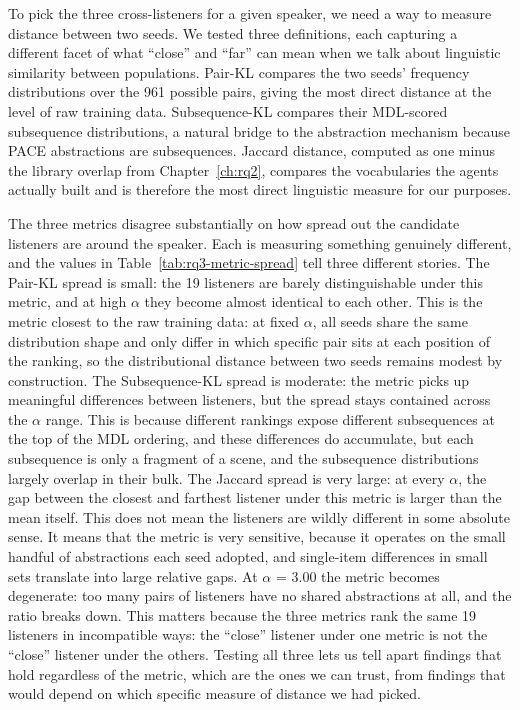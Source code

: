 To pick the three cross-listeners for a given speaker, we need a way to measure distance between two seeds. We tested three definitions, each capturing a different facet of what ``close'' and ``far'' can mean when we talk about linguistic similarity between populations. Pair-KL compares the two seeds' frequency distributions over the 961 possible pairs, giving the most direct distance at the level of raw training data. Subsequence-KL compares their MDL-scored subsequence distributions, a natural bridge to the abstraction mechanism because PACE abstractions are subsequences. Jaccard distance, computed as one minus the library overlap from Chapter~\ref{ch:rq2}, compares the vocabularies the agents actually built and is therefore the most direct linguistic measure for our purposes.

The three metrics disagree substantially on how spread out the candidate listeners are around the speaker. Each is measuring something genuinely different, and the values in Table~\ref{tab:rq3-metric-spread} tell three different stories.
The Pair-KL spread is small: the 19 listeners are barely distinguishable under this metric, and at high $\alpha$ they become almost identical to each other. This is the metric closest to the raw training data: at fixed $\alpha$, all seeds share the same distribution shape and only differ in which specific pair sits at each position of the ranking, so the distributional distance between two seeds remains modest by construction.
The Subsequence-KL spread is moderate: the metric picks up meaningful differences between listeners, but the spread stays contained across the $\alpha$ range. This is because different rankings expose different subsequences at the top of the MDL ordering, and these differences do accumulate, but each subsequence is only a fragment of a scene, and the subsequence distributions largely overlap in their bulk.
The Jaccard spread is very large: at every $\alpha$, the gap between the closest and farthest listener under this metric is larger than the mean itself. This does not mean the listeners are wildly different in some absolute sense. It means that the metric is very sensitive, because it operates on the small handful of abstractions each seed adopted, and single-item differences in small sets translate into large relative gaps. At $\alpha$ = 3.00 the metric becomes degenerate: too many pairs of listeners have no shared abstractions at all, and the ratio breaks down.
This matters because the three metrics rank the same 19 listeners in incompatible ways: the ``close'' listener under one metric is not the ``close'' listener under the others. Testing all three lets us tell apart findings that hold regardless of the metric, which are the ones we can trust, from findings that would depend on which specific measure of distance we had picked.

